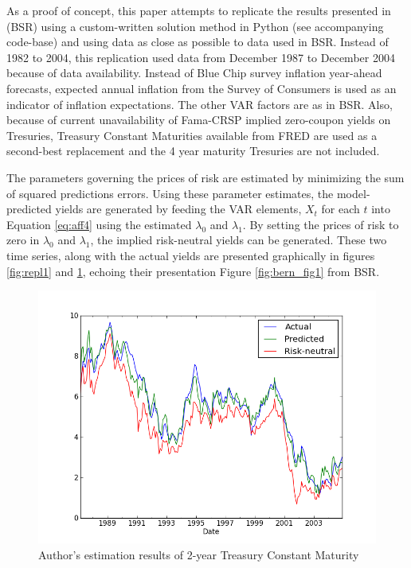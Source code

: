 \documentclass{article}
\numberwithin{equation}{section}
\begin{document}
As a proof of concept, this paper attempts to replicate the results presented
in \citet{sack2005monetary} (BSR) using a custom-written solution method in
Python (see accompanying code-base) and using data as close as possible to data
used in BSR. Instead of 1982 to 2004, this replication used data from December
1987 to December 2004 because of data availability. Instead of Blue Chip survey
inflation year-ahead forecasts, expected annual inflation from the Survey of
Consumers \citet{mich} is used as an indicator of inflation expectations. The
other VAR factors are as in BSR. Also, because of current unavailability of
Fama-CRSP implied zero-coupon yields on Tresuries, Treasury Constant Maturities
available from FRED are used as a second-best replacement \citet{fred} and the
4 year maturity Tresuries are not included.

The parameters governing the prices of risk are estimated by minimizing the sum
of squared predictions errors. Using these parameter estimates, the
model-predicted yields are generated by feeding the VAR elements, $X_t$ for
each $t$ into Equation \ref{eq:aff4} using the estimated $\lambda_0$ and
$\lambda_1$. By setting the prices of risk to zero in $\lambda_0$ and
$\lambda_1$, the implied risk-neutral yields can be generated. These two time
series, along with the actual yields are presented graphically in figures
\ref{fig:repl1} and \ref{fig:repl2}, echoing their presentation Figure
\ref{fig:bern_fig1} from BSR.

\begin{figure}[htp]
  \begin{center}
    \includegraphics[scale=0.6]{./figures/twoyr_rep.png}
  \end{center}
  \caption{Author's estimation results of 2-year Treasury Constant Maturity}
  \label{fig:repl2}
\end{figure}
\end{document}
